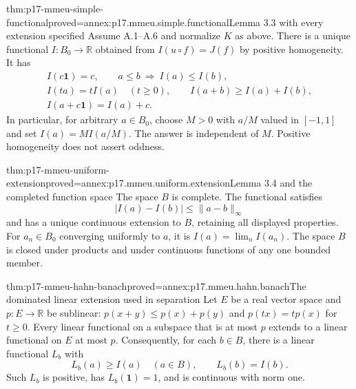 \begin{hbtheorem}{thm:p17-mmeu-simple-functional}{proved=annex:p17.mmeu.simple.functional}{Lemma 3.3 with every extension specified}
Assume A.1--A.6 and normalize \(K\) as above.
There is a unique functional \(I:B_0\to\mathbb R\) obtained
from \(I(u\circ f)=J(f)\) by positive homogeneity.
It has
\[
\begin{gathered}
 I(c\mathbf1)=c,\qquad
 a\leq b\ \Longrightarrow\ I(a)\leq I(b),\\
 I(ta)=tI(a)\quad(t\geq0),\qquad
 I(a+b)\geq I(a)+I(b),\\
 I(a+c\mathbf1)=I(a)+c .
\end{gathered}
\]
In particular, for arbitrary \(a\in B_0\), choose \(M>0\)
with \(a/M\) valued in \([-1,1]\) and set
\(I(a)=M I(a/M)\). The answer is independent of \(M\).
Positive homogeneity does not assert oddness.
\end{hbtheorem}

\begin{hbtheorem}{thm:p17-mmeu-uniform-extension}{proved=annex:p17.mmeu.uniform.extension}{Lemma 3.4 and the completed function space}
The space \(B\) is complete. The functional satisfies
\[
                         |I(a)-I(b)|\leq\|a-b\|_\infty
\]
and has a unique continuous extension to \(B\), retaining
all displayed properties. For \(a_n\in B_0\) converging
uniformly to \(a\), it is \(I(a)=\lim_n I(a_n)\).
The space \(B\) is closed under products and under
continuous functions of any one bounded member.
\end{hbtheorem}

\begin{hbtheorem}{thm:p17-mmeu-hahn-banach}{proved=annex:p17.mmeu.hahn.banach}{The dominated linear extension used in separation}
Let \(E\) be a real vector space and \(p:E\to\mathbb R\)
be sublinear: \(p(x+y)\leq p(x)+p(y)\) and
\(p(tx)=tp(x)\) for \(t\geq0\).
Every linear functional on a subspace that is at most
\(p\) extends to a linear functional on \(E\) at most \(p\).
Consequently, for each \(b\in B\), there is a linear
functional \(L_b\) with
\[
                      L_b(a)\geq I(a)\quad(a\in B),
                               \qquad L_b(b)=I(b).
\]
Such \(L_b\) is positive, has \(L_b(\mathbf1)=1\),
and is continuous with norm one.
\end{hbtheorem}

